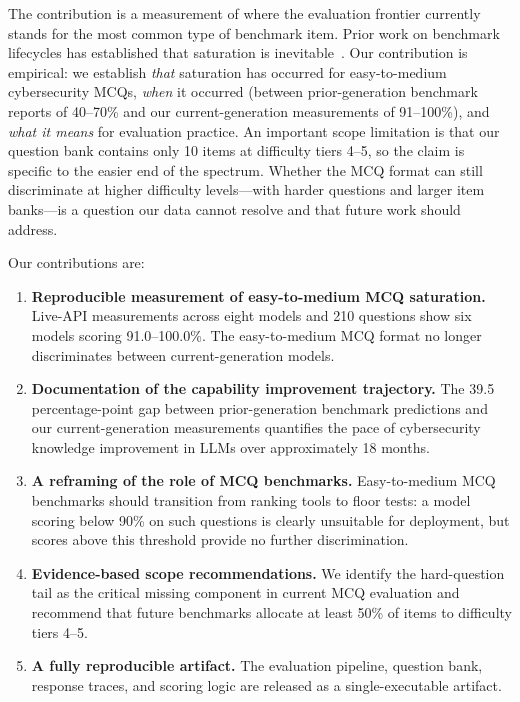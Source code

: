 \documentclass[journal]{IEEEtran}
\begin{document}
The contribution is a measurement of where the evaluation frontier currently stands for the most common type of benchmark item. Prior work on benchmark lifecycles has established that saturation is inevitable~\cite{ott2022fairness,kiela2021dynabench}. Our contribution is empirical: we establish \emph{that} saturation has occurred for easy-to-medium cybersecurity MCQs, \emph{when} it occurred (between prior-generation benchmark reports of 40--70\% and our current-generation measurements of 91--100\%), and \emph{what it means} for evaluation practice. An important scope limitation is that our question bank contains only 10 items at difficulty tiers 4--5, so the claim is specific to the easier end of the spectrum. Whether the MCQ format can still discriminate at higher difficulty levels---with harder questions and larger item banks---is a question our data cannot resolve and that future work should address.

Our contributions are:

\begin{enumerate}[leftmargin=*]
    \item \textbf{Reproducible measurement of easy-to-medium MCQ saturation.} Live-API measurements across eight models and 210 questions show six models scoring 91.0--100.0\%. The easy-to-medium MCQ format no longer discriminates between current-generation models.
    \item \textbf{Documentation of the capability improvement trajectory.} The 39.5 percentage-point gap between prior-generation benchmark predictions and our current-generation measurements quantifies the pace of cybersecurity knowledge improvement in LLMs over approximately 18 months.
    \item \textbf{A reframing of the role of MCQ benchmarks.} Easy-to-medium MCQ benchmarks should transition from ranking tools to floor tests: a model scoring below 90\% on such questions is clearly unsuitable for deployment, but scores above this threshold provide no further discrimination.
    \item \textbf{Evidence-based scope recommendations.} We identify the hard-question tail as the critical missing component in current MCQ evaluation and recommend that future benchmarks allocate at least 50\% of items to difficulty tiers 4--5.
    \item \textbf{A fully reproducible artifact.} The evaluation pipeline, question bank, response traces, and scoring logic are released as a single-executable artifact.
\end{enumerate}
\end{document}
